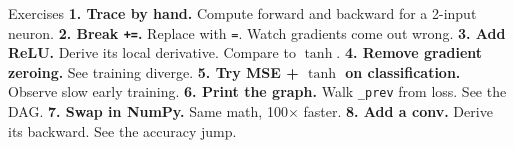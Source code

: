 \documentclass[10pt]{beamer}
\begin{document}
\begin{frame}{Exercises}
    \textbf{1. Trace by hand.} Compute forward and backward for a 2-input neuron.
    \textbf{2. Break \texttt{+=}.} Replace with \texttt{=}. Watch gradients come out wrong.
    \textbf{3. Add ReLU.} Derive its local derivative. Compare to $\tanh$.
    \textbf{4. Remove gradient zeroing.} See training diverge.
    \textbf{5. Try MSE + $\tanh$ on classification.} Observe slow early training.
    \textbf{6. Print the graph.} Walk \texttt{\_prev} from loss. See the DAG.
    \textbf{7. Swap in NumPy.} Same math, 100$\times$ faster.
    \textbf{8. Add a conv.} Derive its backward. See the accuracy jump.
\end{frame}
\end{document}
